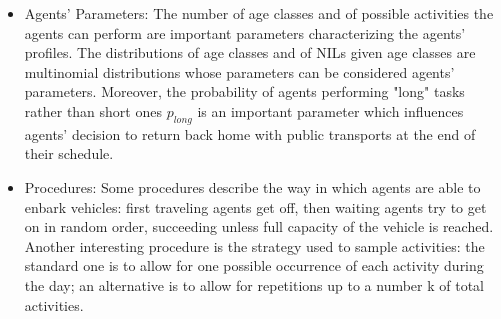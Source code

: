 \begin{itemize}
\item Agents' Parameters: The number of age classes and of possible activities the agents can perform are important parameters characterizing the agents' profiles. The distributions of age classes and of NILs given age classes are multinomial distributions whose parameters can be considered agents' parameters. Moreover, the probability of agents performing "long" tasks rather than short ones $p_{long}$ is an important parameter which influences agents' decision to return back home with public transports at the end of their schedule.
\item Procedures: Some procedures describe the way in which agents are able to enbark vehicles: first traveling agents get off, then waiting agents try to get on in random order, succeeding unless full capacity of the vehicle is reached. Another interesting procedure is the strategy used to sample activities: the standard one is to allow for one possible occurrence of each activity during the day; an alternative is to allow for repetitions up to a number k of total activities. 
\end{itemize}